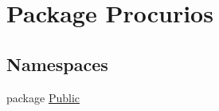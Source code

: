 \hypertarget{namespaceProcurios}{\section{Package Procurios}
\label{namespaceProcurios}
}
\subsection*{Namespaces}
\begin{DoxyCompactItemize}
\item 
package \hyperlink{namespaceProcurios_1_1Public}{Public}
\end{DoxyCompactItemize}

